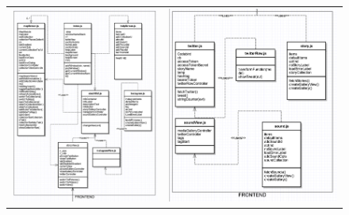 \begin{figure}[!h]
\begin{center}
\begin{tabular}{cc}
\includegraphics[scale=0.15]{classFront1.png}&
\includegraphics[scale=0.15]{classFront2.png}\\

\end{tabular}
\end{center}
\end{figure}
